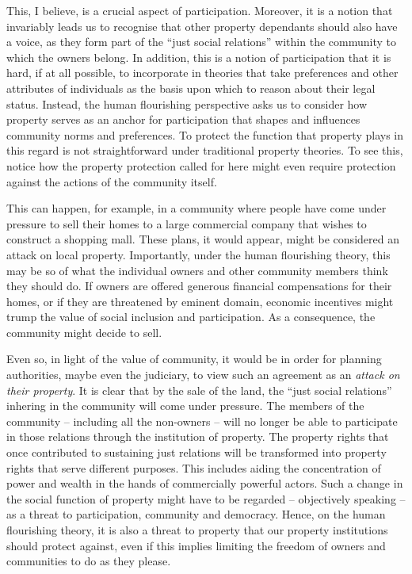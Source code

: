 This, I believe, is a crucial aspect of participation. Moreover, it is a notion that invariably leads us to recognise that other property dependants should also have a voice, as they form part of the ``just social relations'' within the community to which the owners belong. In addition, this is a notion of participation that it is hard, if at all possible, to incorporate in theories that take preferences and other attributes of individuals as the basis upon which to reason about their legal status. Instead, the human flourishing perspective asks us to consider how property serves as an anchor for participation that shapes and influences community norms and preferences. To protect the function that property plays in this regard is not straightforward under traditional property theories. To see this, notice how the property protection called for here might even require protection against the actions of the community itself.

This can happen, for example, in a community where people have come under pressure to sell their homes to a large commercial company that wishes to construct a shopping mall. These plans, it would appear, might be considered an attack on local property. Importantly, under the human flourishing theory, this may be so  of what the individual owners and other community members think they should do. If owners are offered generous financial compensations for their homes, or if they are threatened by eminent domain, economic incentives might trump the value of social inclusion and participation. As a consequence, the community might decide to sell. 

Even so, in light of the value of community, it would be in order for planning authorities, maybe even the judiciary, to view such an agreement as an {\it attack on their property}. It is clear that by the sale of the land, the ``just social relations'' inhering in the community will come under pressure. The members of the community -- including all the non-owners -- will no longer be able to participate in those relations through the institution of property. The property rights that once contributed to sustaining just relations will be transformed into property rights that serve different purposes. This includes aiding the concentration of power and wealth in the hands of commercially powerful actors. Such a change in the social function of property might have to be regarded -- objectively speaking -- as a threat to participation, community and democracy. Hence, on the human flourishing theory, it is also a threat to property that our property institutions should protect against, even if this implies limiting the freedom of owners and communities to do as they please.

